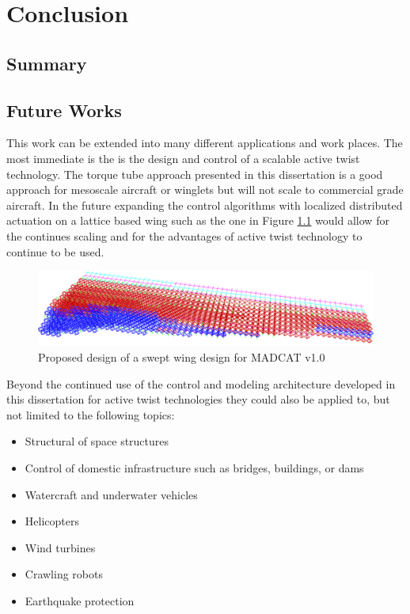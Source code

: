 \documentclass[11pt]{ucthesis}
\begin{document}
\chapter{Conclusion}
\section{Summary}
\section{Future Works}
This work can be extended into many different applications and work places. The most immediate is the is the design and control of a scalable active twist technology. The torque tube approach presented in this dissertation is a good approach for mesoscale aircraft or winglets but will not scale to commercial grade aircraft. In the future expanding the control algorithms with localized distributed actuation on a lattice based wing such as the one in Figure \ref{fig:MADCAT} would allow for the continues scaling and for the advantages of active twist technology to continue to be used.

\begin{figure}[thpb]
\centering
\includegraphics[width=0.75\linewidth]{./Figures/MADCATSwept.png}
\caption{Proposed design of a swept wing design for MADCAT v1.0}
\label{fig:MADCAT}
\end{figure}

Beyond the continued use of the control and modeling architecture developed in this dissertation for active twist technologies they could also be applied to, but not limited to the following topics:

\begin{itemize}
\item Structural of space structures
\item Control of domestic infrastructure such as bridges, buildings, or dams
\item Watercraft and underwater vehicles
\item Helicopters
\item Wind turbines
\item Crawling robots
\item Earthquake protection
\end{itemize}
\end{document}
